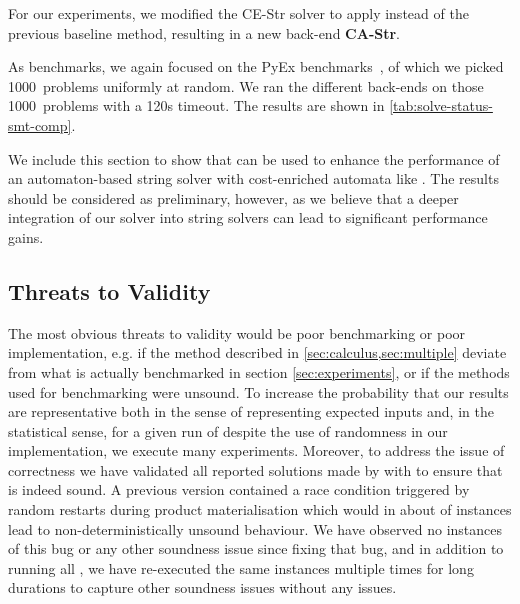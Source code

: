 For our experiments, we modified the CE-Str solver to apply \Catra{}
instead of the previous baseline method, resulting in a new back-end
\textbf{CA-Str}.

As benchmarks, we again focused on the PyEx benchmarks~\cite{pyex}, of
which we picked 1000~problems uniformly at random. We ran the
different back-ends on those 1000~problems with a 120s timeout.
%
The results are shown in \cref{tab:solve-status-smt-comp}.
%

We include this section to show that \Calculus{} can be used to enhance the
performance of an automaton-based string solver with cost-enriched automata like
\Ostrich{}. The results should be considered as preliminary, however, 
as we believe that a deeper integration of our \Catra{} solver into
string solvers can lead to significant performance gains.

\subsection{Threats to Validity}

The most obvious threats to validity would be poor benchmarking or poor
implementation, e.g. if the method described in \cref{sec:calculus,sec:multiple}
deviate from what is actually benchmarked in section \cref{sec:experiments}, or
if the methods used for benchmarking were unsound. To increase the probability
that our results are representative both in the sense of representing expected
inputs and, in the statistical sense, for a given run of \Catra{} despite the
use of randomness in our implementation, we execute many experiments. Moreover,
to address the issue of correctness we have validated all reported solutions
made by \Calculus{} with \Nuxmv{} to ensure that \Calculus{} is indeed sound. A
previous version contained a race condition triggered by random restarts during
product materialisation which would in about  of instances lead to
non-deterministically unsound behaviour. We have observed no instances of this
bug or any other soundness issue since fixing that bug, and in addition to
running all \NrBenchmarks{}, we have re-executed the same instances multiple
times for long durations to capture other soundness issues without any issues.

